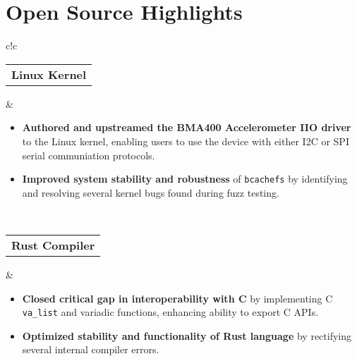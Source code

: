 \documentclass[a4paper,skipsamekey,11pt,english]{curve}
\begin{document}
  \section{Open Source Highlights}
  \begin{center}
    {
    \setlength{\tabcolsep}{1em}
    \begin{tabular}{c!{\color{blue}\vrule}c}
      \vspace{1pt}
      {
       \begin{tabular}{c}
         \color{base03}\textbf{Linux Kernel}
       \end{tabular}
      } & {
        \begin{minipage}{5in}
          \vspace{5pt}
          \begin{itemize}
            \item \textbf{Authored and upstreamed the BMA400 Accelerometer IIO
            driver} to the Linux kernel, enabling users to use the device with
            either I2C or SPI serial communiation protocols.
            \item \textbf{Improved system stability and robustness} of
            \texttt{bcachefs} by identifying and resolving several kernel
            bugs found during fuzz testing.
          \end{itemize}
        \end{minipage}
      }
      \\
      \hline
      {
       \begin{tabular}{c}
         \color{base03}\textbf{Rust Compiler}
       \end{tabular}
      } & {
        \begin{minipage}{5in}
          \vspace{5pt}
          \begin{itemize}
            \item \textbf{Closed critical gap in interoperability with C} by
            implementing C \texttt{va\_list} and variadic functions, enhancing
            ability to export C APIs.
            \item \textbf{Optimized stability and functionality of Rust language}
            by rectifying several internal compiler errors.
          \end{itemize}
        \end{minipage}
        \vspace{1pt}
      }
      \\

\end{tabular}}
\end{center}
\end{document}
